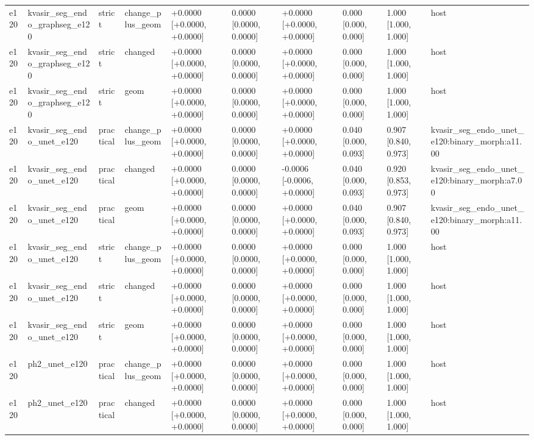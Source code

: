 \begin{table}[t]
\begin{tabular}{llllllllll}
e120 & kvasir\_seg\_endo\_graphseg\_e120 & strict & change\_plus\_geom & +0.0000 [+0.0000, +0.0000] & 0.0000 [0.0000, 0.0000] & +0.0000 [+0.0000, +0.0000] & 0.000 [0.000, 0.000] & 1.000 [1.000, 1.000] & host \\
e120 & kvasir\_seg\_endo\_graphseg\_e120 & strict & changed & +0.0000 [+0.0000, +0.0000] & 0.0000 [0.0000, 0.0000] & +0.0000 [+0.0000, +0.0000] & 0.000 [0.000, 0.000] & 1.000 [1.000, 1.000] & host \\
e120 & kvasir\_seg\_endo\_graphseg\_e120 & strict & geom & +0.0000 [+0.0000, +0.0000] & 0.0000 [0.0000, 0.0000] & +0.0000 [+0.0000, +0.0000] & 0.000 [0.000, 0.000] & 1.000 [1.000, 1.000] & host \\
e120 & kvasir\_seg\_endo\_unet\_e120 & practical & change\_plus\_geom & +0.0000 [+0.0000, +0.0000] & 0.0000 [0.0000, 0.0000] & +0.0000 [+0.0000, +0.0000] & 0.040 [0.000, 0.093] & 0.907 [0.840, 0.973] & kvasir\_seg\_endo\_unet\_e120:binary\_morph:a11.00 \\
e120 & kvasir\_seg\_endo\_unet\_e120 & practical & changed & +0.0000 [+0.0000, +0.0000] & 0.0000 [0.0000, 0.0000] & -0.0006 [-0.0006, +0.0000] & 0.040 [0.000, 0.093] & 0.920 [0.853, 0.973] & kvasir\_seg\_endo\_unet\_e120:binary\_morph:a7.00 \\
e120 & kvasir\_seg\_endo\_unet\_e120 & practical & geom & +0.0000 [+0.0000, +0.0000] & 0.0000 [0.0000, 0.0000] & +0.0000 [+0.0000, +0.0000] & 0.040 [0.000, 0.093] & 0.907 [0.840, 0.973] & kvasir\_seg\_endo\_unet\_e120:binary\_morph:a11.00 \\
e120 & kvasir\_seg\_endo\_unet\_e120 & strict & change\_plus\_geom & +0.0000 [+0.0000, +0.0000] & 0.0000 [0.0000, 0.0000] & +0.0000 [+0.0000, +0.0000] & 0.000 [0.000, 0.000] & 1.000 [1.000, 1.000] & host \\
e120 & kvasir\_seg\_endo\_unet\_e120 & strict & changed & +0.0000 [+0.0000, +0.0000] & 0.0000 [0.0000, 0.0000] & +0.0000 [+0.0000, +0.0000] & 0.000 [0.000, 0.000] & 1.000 [1.000, 1.000] & host \\
e120 & kvasir\_seg\_endo\_unet\_e120 & strict & geom & +0.0000 [+0.0000, +0.0000] & 0.0000 [0.0000, 0.0000] & +0.0000 [+0.0000, +0.0000] & 0.000 [0.000, 0.000] & 1.000 [1.000, 1.000] & host \\
e120 & ph2\_unet\_e120 & practical & change\_plus\_geom & +0.0000 [+0.0000, +0.0000] & 0.0000 [0.0000, 0.0000] & +0.0000 [+0.0000, +0.0000] & 0.000 [0.000, 0.000] & 1.000 [1.000, 1.000] & host \\
e120 & ph2\_unet\_e120 & practical & changed & +0.0000 [+0.0000, +0.0000] & 0.0000 [0.0000, 0.0000] & +0.0000 [+0.0000, +0.0000] & 0.000 [0.000, 0.000] & 1.000 [1.000, 1.000] & host \\

\end{tabular}
\end{table}
